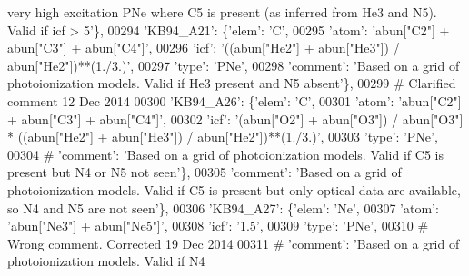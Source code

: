 \begin{DoxyCode}
{       very high excitation PNe where C5 is present (as inferred from He3 and N5). Valid if icf > 5'}\},
00294                          \textcolor{stringliteral}{'KB94\_A21'}: \{\textcolor{stringliteral}{'elem'}: \textcolor{stringliteral}{'C'},
00295                                       \textcolor{stringliteral}{'atom'}: \textcolor{stringliteral}{'abun["C2"] + abun["C3"] + abun["C4"]'},
00296                                       \textcolor{stringliteral}{'icf'}: \textcolor{stringliteral}{'((abun["He2"] + abun["He3"]) / abun["He2"])**(1./3.)'},
00297                                       \textcolor{stringliteral}{'type'}: \textcolor{stringliteral}{'PNe'},
00298                                       \textcolor{stringliteral}{'comment'}: \textcolor{stringliteral}{'Based on a grid of photoionization models. Valid if He3
       present and N5 absent'}\},
00299 \textcolor{comment}{# Clarified comment 12 Dec 2014}
00300                          \textcolor{stringliteral}{'KB94\_A26'}: \{\textcolor{stringliteral}{'elem'}: \textcolor{stringliteral}{'C'},
00301                                       \textcolor{stringliteral}{'atom'}: \textcolor{stringliteral}{'abun["C2"] + abun["C3"] + abun["C4"]'},
00302                                       \textcolor{stringliteral}{'icf'}: \textcolor{stringliteral}{'(abun["O2"] + abun["O3"]) / abun["O3"] * ((abun["He2"] +
       abun["He3"]) / abun["He2"])**(1./3.)'},
00303                                       \textcolor{stringliteral}{'type'}: \textcolor{stringliteral}{'PNe'},
00304 \textcolor{comment}{#                                      'comment': 'Based on a grid of photoionization models. Valid if C5
       is present but N4 or N5 not seen'\},}
00305                                       \textcolor{stringliteral}{'comment'}: \textcolor{stringliteral}{'Based on a grid of photoionization models. Valid if C5 is
       present but only optical data are available, so N4 and N5 are not seen'}\},
00306                          \textcolor{stringliteral}{'KB94\_A27'}: \{\textcolor{stringliteral}{'elem'}: \textcolor{stringliteral}{'Ne'},
00307                                       \textcolor{stringliteral}{'atom'}: \textcolor{stringliteral}{'abun["Ne3"] + abun["Ne5"]'},
00308                                       \textcolor{stringliteral}{'icf'}: \textcolor{stringliteral}{'1.5'},
00309                                       \textcolor{stringliteral}{'type'}: \textcolor{stringliteral}{'PNe'},
00310 \textcolor{comment}{# Wrong comment. Corrected 19 Dec 2014}
00311 \textcolor{comment}{#                                      'comment': 'Based on a grid of photoionization models. Valid if N4
}
\end{DoxyCode}
